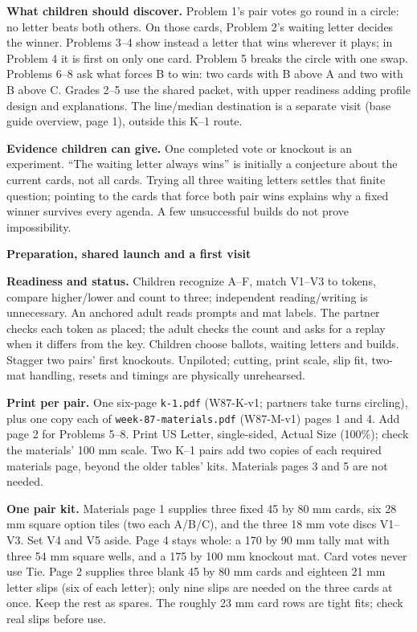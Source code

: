 \documentclass[11pt]{article}
\newcommand{\head}[1]{\par\textbf{\large #1}\par}
\begin{document}
\textbf{What children should discover.} Problem 1's pair votes go round in a circle: no letter beats both others. On those cards, Problem 2's waiting letter decides the winner. Problems 3--4 show instead a letter that wins wherever it plays; in Problem 4 it is first on only one card. Problem 5 breaks the circle with one swap. Problems 6--8 ask what forces B to win: two cards with B above A and two with B above C. Grades 2--5 use the shared packet, with upper readiness adding profile design and explanations. The line/median destination is a separate visit (base guide overview, page 1), outside this K--1 route.

\textbf{Evidence children can give.} One completed vote or knockout is an experiment. ``The waiting letter always wins'' is initially a conjecture about the current cards, not all cards. Trying all three waiting letters settles that finite question; pointing to the cards that force both pair wins explains why a fixed winner survives every agenda. A few unsuccessful builds do not prove impossibility.

\newpage
\head{Preparation, shared launch and a first visit}
\textbf{Readiness and status.} Children recognize A--F, match V1--V3 to tokens, compare higher/lower and count to three; independent reading/writing is unnecessary. An anchored adult reads prompts and mat labels. The partner checks each token as placed; the adult checks the count and asks for a replay when it differs from the key. Children choose ballots, waiting letters and builds. Stagger two pairs' first knockouts. Unpiloted; cutting, print scale, slip fit, two-mat handling, resets and timings are physically unrehearsed.

\textbf{Print per pair.} One six-page \texttt{k-1.pdf} (W87-K-v1; partners take turns circling), plus one copy each of \texttt{week-87-materials.pdf} (W87-M-v1) pages 1 and 4. Add page 2 for Problems 5--8. Print US Letter, single-sided, Actual Size (100\%); check the materials' 100 mm scale. Two K--1 pairs add two copies of each required materials page, beyond the older tables' kits. Materials pages 3 and 5 are not needed.

\textbf{One pair kit.} Materials page 1 supplies three fixed 45 by 80 mm cards, six 28 mm square option tiles (two each A/B/C), and the three 18 mm vote discs V1--V3. Set V4 and V5 aside. Page 4 stays whole: a 170 by 90 mm tally mat with three 54 mm square wells, and a 175 by 100 mm knockout mat. Card votes never use Tie. Page 2 supplies three blank 45 by 80 mm cards and eighteen 21 mm letter slips (six of each letter); only nine slips are needed on the three cards at once. Keep the rest as spares. The roughly 23 mm card rows are tight fits; check real slips before use.
\end{document}

